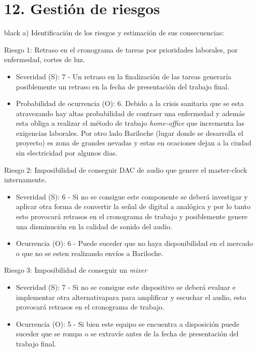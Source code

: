 \documentclass[11pt]{charter}
\begin{document}
\section{12. Gestión de riesgos}
\label{sec:riesgos}

\begin{consigna}{black}
a) Identificación de los riesgos y estimación de sus consecuencias:
 
Riesgo 1: Retraso en el cronograma de tareas por prioridades laborales, por enfermedad, cortes de luz.
\begin{itemize}
\item Severidad (S): 7 - Un retraso en la finalización de las tareas generaría posiblemente un retraso en la fecha de presentación del trabajo final.
\item Probabilidad de ocurrencia (O): 6. Debido a la crisis sanitaria que se esta atravezando hay altas probabilidad de contraer una enfermedad y además esta obliga a realizar el método de trabajo \textit{home-office} que incrementa las exigencias laborales. Por otro lado Bariloche (lugar donde se desarrolla el proyecto) es zona de grandes nevadas y estas en ocaciones dejan a la ciudad sin electricidad por algunos dias.
\end{itemize}   

Riesgo 2: Imposibilidad de conseguir DAC  de audio que genere el master-clock internamente.
\begin{itemize}
\item Severidad (S): 6 - Si no se consigue este componente se deberá investigar y aplicar otra forma de convertir la señal de digital a analógica y por lo tanto esto provocará retrasos en el cronograma de trabajo y posiblemente genere una disminución en la calidad de sonido del audio.
\item Ocurrencia (O): 6 -  Puede suceder que no haya disponibilidad en el mercado o que no se esten realizando envíos a Bariloche. 
\end{itemize}

Riesgo 3: Imposibilidad de conseguir un \textit{mixer}
\begin{itemize}
\item Severidad (S): 7 - Si no se consigue este dispositivo se deberá evaluar e implementar otra alternativapara para amplificar y escuchar el audio, esto provocará retrasos en el cronograma de trabajo. 
\item Ocurrencia (O): 5 - Si bien este equipo se encuentra a disposición puede suceder que se rompa o se extravíe antes de la fecha de presentación del trabajo final.
\end{itemize}


\end{consigna}
\end{document}

